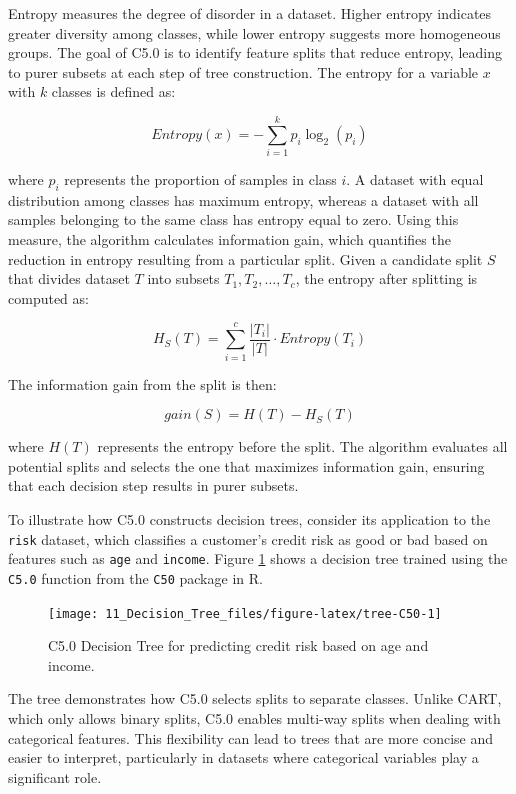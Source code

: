 \documentclass[
  11pt,
]{book}
\newcommand{\passthrough}[1]{#1}
\theoremstyle{definition}
\theoremstyle{definition}
\theoremstyle{definition}
\theoremstyle{definition}
\theoremstyle{remark}
\begin{document}
Entropy measures the degree of disorder in a dataset. Higher entropy indicates greater diversity among classes, while lower entropy suggests more homogeneous groups. The goal of C5.0 is to identify feature splits that reduce entropy, leading to purer subsets at each step of tree construction. The entropy for a variable \(x\) with \(k\) classes is defined as:

\[
Entropy(x) = - \sum_{i=1}^k p_i \log_2(p_i)
\]

where \(p_i\) represents the proportion of samples in class \(i\). A dataset with equal distribution among classes has maximum entropy, whereas a dataset with all samples belonging to the same class has entropy equal to zero. Using this measure, the algorithm calculates information gain, which quantifies the reduction in entropy resulting from a particular split. Given a candidate split \(S\) that divides dataset \(T\) into subsets \(T_1, T_2, \dots, T_c\), the entropy after splitting is computed as:

\[
H_S(T) = \sum_{i=1}^c \frac{|T_i|}{|T|} \cdot Entropy(T_i)
\]

The information gain from the split is then:

\[
gain(S) = H(T) - H_S(T)
\]

where \(H(T)\) represents the entropy before the split. The algorithm evaluates all potential splits and selects the one that maximizes information gain, ensuring that each decision step results in purer subsets.

To illustrate how C5.0 constructs decision trees, consider its application to the \passthrough{\lstinline!risk!} dataset, which classifies a customer's credit risk as good or bad based on features such as \passthrough{\lstinline!age!} and \passthrough{\lstinline!income!}. Figure \ref{fig:tree-C50} shows a decision tree trained using the \passthrough{\lstinline!C5.0!} function from the \passthrough{\lstinline!C50!} package in R.

\begin{figure}[H]

{\centering \texttt{[image: 11\_Decision\_Tree\_files/figure-latex/tree-C50-1]} 

}

\caption{C5.0 Decision Tree for predicting credit risk based on age and income.}\label{fig:tree-C50}
\end{figure}

The tree demonstrates how C5.0 selects splits to separate classes. Unlike CART, which only allows binary splits, C5.0 enables multi-way splits when dealing with categorical features. This flexibility can lead to trees that are more concise and easier to interpret, particularly in datasets where categorical variables play a significant role.
\end{document}
